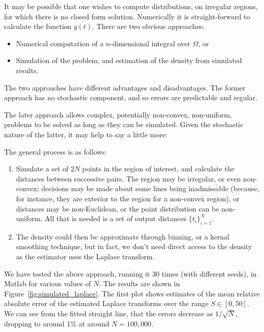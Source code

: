 \documentclass{article}
\begin{document}
It may be possible that one wishes to compute distributions, on
irregular regions, for which there is no closed form solution.
Numerically it is straight-forward to calculate the function
$g(t)$. There are two obvious approaches:
\begin{itemize}

\item Numerical computation of a $n$-dimensional integral over
  $\Omega$, or

\item Simulation of the problem, and estimation of the density from
  simulated results. 

\end{itemize}
The two approaches have different advantages and disadvantages. The
former approach has no stochastic component, and so errors are
predictable and regular. 

The later approach allows complex, potentially non-convex,
non-uniform, problems to be solved as long as they can be
simulated. Given the stochastic nature of the latter, it may help to
say a little more:

The general process is as follows:
\begin{enumerate}

\item Simulate a set of $2N$ points in the region of interest, and
  calculate the distances between successive pairs. The region may be
  irregular, or even non-convex; decisions may be made about some
  lines being inadmissable (because, for instance, they are exterior
  to the region for a non-convex region), or distances may be
  non-Euclidean, or the point distribution can be non-uniform. All
  that is needed is a set of output distances $\{ t_i \}_{i=1}^{N}$.

\item The density could then be approximate through binning, or a
  kernal smoothing technique, but in fact, we don't need direct access
  to the density as the estimator uses the Laplace transform.

\end{enumerate}

We have tested the above approach, running it 30 times (with different
seeds), in Matlab for various values of $N$. The results are shown in
Figure~\ref{fig:simulated_laplace}. The first plot shows estimates of
the mean relative absolute error of the estimated Laplace transforms
over the range $S \in [0, 50]$. We can see from the fitted straight
line, that the errors decrease as $1/\sqrt{N}$, dropping to around 1\%
at around $N=100,000$.
\end{document}
